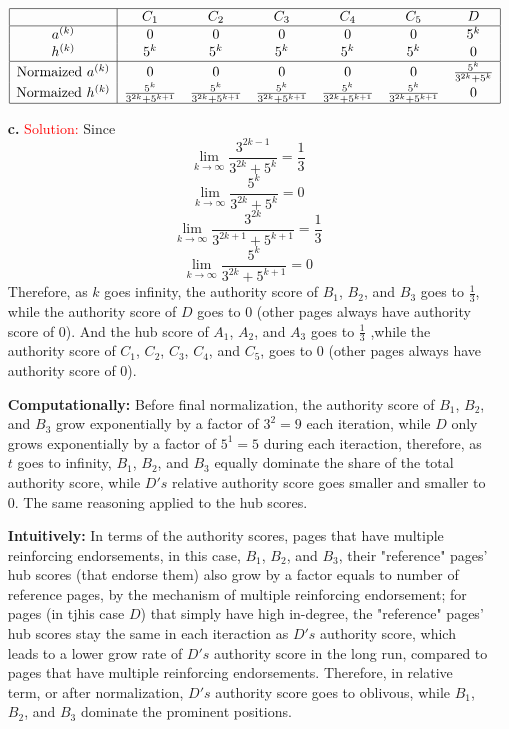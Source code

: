 \documentclass[11pt]{article} %
\begin{document}
\begin{itemize}
$$\begin{array} {|c | c c c c c c |} \hline
 &  \text{$C_1$}  & \text{$C_2$}  & \text{$C_3$} & \text{$C_4$} & \text{$C_5$} & \text{$D$}\\ \hline 
a^{(k)}  & 0  & 0 & 0 & 0  & 0 & 5^k\\  
h^{(k)}  & 5^k & 5^k& 5^k  & 5^k& 5^k & 0\\ \hline
\text{Normaized} \ a^{(k)}  & 0  & 0 & 0 & 0  & 0 & \frac{5^k}{3^{2k}+5^k} \\  
\text{Normaized} \  h^{(k)}   & \frac{5^k}{3^{2k}+5^{k+1}} & \frac{5^k}{3^{2k}+5^{k+1}} & \frac{5^k}{3^{2k}+5^{k+1}}  & \frac{5^k}{3^{2k}+5^{k+1}} & \frac{5^k}{3^{2k}+5^{k+1}} & 0\\ \hline
\end{array}$$


\item[\textbf{c. }] \textcolor{red}{Solution:} 
Since $$ \lim_{k \to \infty} \frac{3^{2k-1}}{3^{2k}+5^k}=\frac{1}{3}$$
$$ \lim_{k \to \infty} \frac{5^k}{3^{2k}+5^k}=0$$ 
$$ \lim_{k \to \infty} \frac{3^{2k}}{3^{2k+1}+5^{k+1}}=\frac{1}{3}$$
$$ \lim_{k \to \infty} \frac{5^k}{3^{2k}+5^{k+1}}=0$$ 
Therefore, as $k$ goes infinity, the authority score of $B_1$, $B_2$, and $B_3$ goes to $\frac{1}{3}$, while the authority score of $D$ goes to 0 (other pages always have authority score of 0). And the hub score of $A_1$, $A_2$, and $A_3$ goes to $\frac{1}{3}$ ,while the authority score of  $C_1$, $C_2$, $C_3$, $C_4$, and $C_5$, goes to 0 (other pages always have authority score of 0). 

\textbf{Computationally:} Before final normalization, the authority score of $B_1$, $B_2$, and $B_3$ grow exponentially by a factor of $3^2=9$ each iteration, while $D$ only grows exponentially by a factor of $5^1=5$ during each iteraction, therefore, as $t$ goes to infinity, $B_1$, $B_2$, and $B_3$ equally dominate the share of the total authority score, while $D's$ relative authority score goes smaller and smaller to 0. The same reasoning applied to the hub scores.

\textbf{Intuitively:} In terms of the authority scores, pages that have multiple reinforcing endorsements, in this case, $B_1$, $B_2$, and $B_3$, their "reference" pages' hub scores  (that endorse them) also grow by a factor equals to number of reference pages, by the mechanism of multiple reinforcing endorsement; for pages (in tjhis case $D$) that simply have high in-degree, the "reference" pages' hub scores stay the same in each iteraction as $D's$ authority score, which leads to a lower grow rate of $D's$ authority score in the long run, compared to pages that have multiple reinforcing endorsements. Therefore, in relative term, or after normalization, $D's$ authority score goes to oblivous, while $B_1$, $B_2$, and $B_3$ dominate the prominent positions.

\end{itemize}
\end{document}
